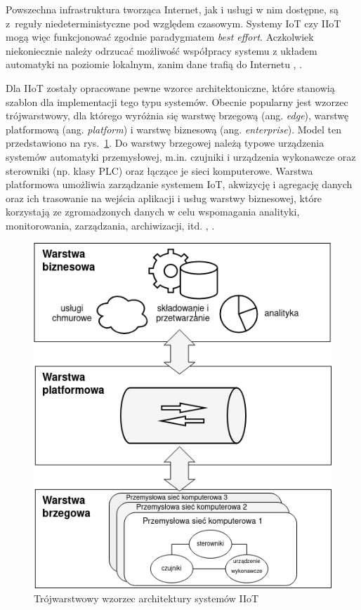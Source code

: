 \documentclass[a4paper, 12pt, twoside]{article}
\begin{document}
Powszechna infrastruktura tworząca Internet, jak i usługi w nim dostępne, są z~reguły
niedeterministyczne pod względem czasowym. Systemy IoT czy IIoT mogą więc
funkcjonować zgodnie paradygmatem \emph{best effort}. Aczkolwiek niekoniecznie
należy odrzucać możliwość współpracy systemu z układem automatyki na poziomie lokalnym,
zanim dane trafią do Internetu \cite{iiot-design-and-impl-gateway}, \cite{iiot-rapid-integration-framework}.

Dla IIoT zostały opracowane pewne wzorce architektoniczne,
które stanowią szablon dla implementacji tego typu systemów.
Obecnie popularny jest wzorzec trójwarstwowy, dla którego wyróżnia się
warstwę brzegową (ang. \emph{edge}), warstwę platformową (ang. \emph{platform})
i warstwę biznesową (ang. \emph{enterprise}).
Model ten przedstawiono na rys.~\ref{fig:iiot-arch}. Do warstwy brzegowej należą
typowe urządzenia systemów automatyki przemysłowej, m.in. czujniki i urządzenia wykonawcze oraz
sterowniki (np. klasy PLC) oraz łączące je sieci komputerowe. Warstwa platformowa umożliwia zarządzanie
systemem IoT, akwizycję i agregację danych oraz ich trasowanie na wejścia
aplikacji i usług warstwy biznesowej, które
korzystają ze zgromadzonych danych w celu wspomagania
analityki, monitorowania, zarządzania, archiwizacji, itd. \cite{iiot-challenges-opportunities-directions},  \cite{models-innovative-iot}.

\begin{figure}[h]
      \centering
      \includegraphics[scale=0.6]{iiot_arch.png}
      \caption{Trójwarstwowy wzorzec architektury systemów IIoT}
      \label{fig:iiot-arch}
\end{figure}
\end{document}
